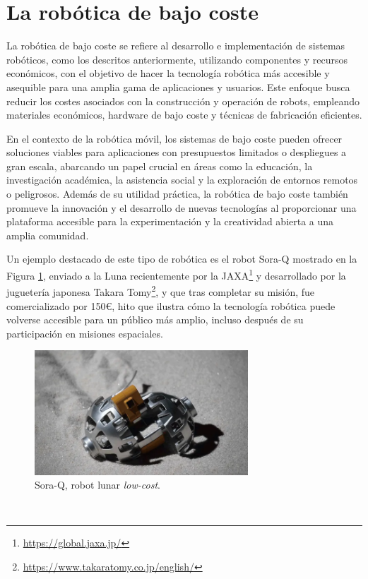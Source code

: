 \section{La robótica de bajo coste}
\label{sec:robotica_bajo_coste} %

La robótica de bajo coste se refiere al desarrollo e implementación de sistemas
robóticos, como los descritos anteriormente, utilizando componentes y recursos
económicos, con el objetivo de hacer la tecnología robótica más accesible y
asequible para una amplia gama de aplicaciones y usuarios.
Este enfoque busca reducir los costes asociados con la construcción y operación
de robots, empleando materiales económicos, hardware de bajo coste y técnicas
de fabricación eficientes.

En el contexto de la robótica móvil, los sistemas de bajo coste pueden ofrecer
soluciones viables para aplicaciones con presupuestos limitados o despliegues a
gran escala, abarcando un papel crucial en áreas como la educación, la
investigación académica, la asistencia social y la exploración de entornos
remotos o peligrosos.
Además de su utilidad práctica, la robótica de bajo coste también promueve la
innovación y el desarrollo de nuevas tecnologías al proporcionar una plataforma
accesible para la experimentación y la creatividad abierta a una amplia
comunidad.

Un ejemplo destacado de este tipo de robótica es el robot Sora-Q mostrado en la
Figura \ref{fig:sora_q}, enviado a la Luna recientemente por la
JAXA\footnote{\url{https://global.jaxa.jp/}} y desarrollado por la juguetería
japonesa Takara Tomy\footnote{\url{https://www.takaratomy.co.jp/english/}}, y
que tras completar su misión, fue comercializado por 150\euro, hito que ilustra
cómo la tecnología robótica puede volverse accesible para un público más amplio,
incluso después de su participación en misiones espaciales.

\begin{figure} [h!]
  \begin{center}
    \includegraphics[width=8cm]{figs/SoraQ_lunar_robot_JAXA}
  \end{center}
  \caption{Sora-Q, robot lunar \textit{low-cost}.}
  \label{fig:sora_q}
\end{figure}\

